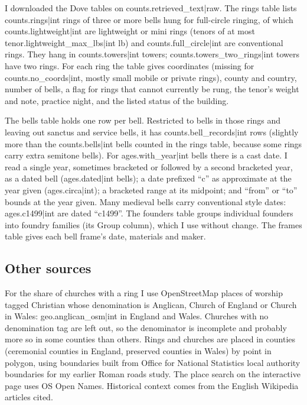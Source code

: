 \documentclass[11pt,a4paper]{article}
\begin{document}
I downloaded the Dove tables on {{counts.retrieved_text|raw}}. The rings table lists {{counts.rings|int}} rings of three or more bells hung for full-circle ringing, of which {{counts.lightweight|int}} are lightweight or mini rings (tenors of at most {{tenor.lightweight_max_lbs|int}} lb) and {{counts.full_circle|int}} are conventional rings. They hang in {{counts.towers|int}} towers; {{counts.towers_two_rings|int}} towers have two rings. For each ring the table gives coordinates (missing for {{counts.no_coords|int}}, mostly small mobile or private rings), county and country, number of bells, a flag for rings that cannot currently be rung, the tenor's weight and note, practice night, and the listed status of the building.

The bells table holds one row per bell. Restricted to bells in those rings and leaving out sanctus and service bells, it has {{counts.bell_records|int}} rows (slightly more than the {{counts.bells|int}} bells counted in the rings table, because some rings carry extra semitone bells). For {{ages.with_year|int}} bells there is a cast date. I read a single year, sometimes bracketed or followed by a second bracketed year, as a dated bell ({{ages.dated|int}} bells); a date prefixed ``c'' as approximate at the year given ({{ages.circa|int}}); a bracketed range at its midpoint; and ``from'' or ``to'' bounds at the year given. Many medieval bells carry conventional style dates: {{ages.c1499|int}} are dated ``c1499''. The founders table groups individual founders into foundry families (its Group column), which I use without change. The frames table gives each bell frame's date, materials and maker.

\subsection{Other sources}

For the share of churches with a ring I use OpenStreetMap places of worship tagged Christian whose denomination is Anglican, Church of England or Church in Wales: {{geo.anglican_osm|int}} in England and Wales. Churches with no denomination tag are left out, so the denominator is incomplete and probably more so in some counties than others. Rings and churches are placed in counties (ceremonial counties in England, preserved counties in Wales) by point in polygon, using boundaries built from Office for National Statistics local authority boundaries for my earlier Roman roads study. The place search on the interactive page uses OS Open Names. Historical context comes from the English Wikipedia articles cited.
\end{document}
